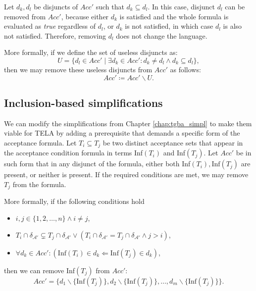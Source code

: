 \documentclass[
  digital, %
  twoside, %
  table,   %
  lof,     %
  lot,     %
]{fithesis3}
\begin{document}
Let $d_k, d_l$ be disjuncts of $Acc'$ such that $d_k \subseteq d_l$. In this case, disjunct $d_l$ can be removed from $Acc'$, because either $d_k$ is satisfied and the whole formula is evaluated as \emph{true} regardless of $d_l$, or $d_k$ is not satisfied, in which case $d_l$ is also not satisfied. Therefore, removing $d_l$ does not change the language.

More formally, if we define the set of useless disjuncts as:
\begin{equation*}
  U = \{d_l \in Acc' \mid \exists d_k \in Acc' \colon d_k \neq d_l \wedge d_k \subseteq d_l\},
\end{equation*}
then we may remove these useless disjuncts from $Acc'$ as follows:
\begin{equation*}
  Acc' \coloneqq Acc' \smallsetminus U.
\end{equation*}

\subsection{Inclusion-based simplifications}
We can modify the simplifications from Chapter \ref{chap:tgba_simpl} to make them viable for TELA by adding a prerequisite that demands a specific form of the acceptance formula. Let $T_i \subseteq T_j$ be two distinct acceptance sets that appear in the acceptance condition formula in terms Inf$(T_i)$ and Inf$(T_j)$. Let $Acc'$ be in such form that in any disjunct of the formula, either both Inf$(T_i), \text{Inf}(T_j)$ are present, or neither is present. If the required conditions are met, we may remove $T_j$ from the formula. 

More formally, if the following conditions hold
\begin{itemize}
  \item $i, j \in \{1, 2, \dots, n\} \wedge i \neq j$,
  \item $T_i \cap \delta_{\mathcal{A'}} \subsetneq T_j \cap \delta_{\mathcal{A'}} \vee (T_i \cap \delta_{\mathcal{A'}} = T_j \cap \delta_{\mathcal{A'}} \wedge j > i)$,
  \item $\forall d_k \in Acc' \colon (\text{Inf}(T_i) \in d_k \Leftarrow \text{Inf}(T_j) \in d_k)$,
\end{itemize}
then we can remove Inf$(T_j)$ from $Acc'$: 
\begin{equation*}
  Acc' = \{d_1 \smallsetminus \{\text{Inf}(T_j)\}, d_2 \smallsetminus \{\text{Inf}(T_j)\}, \dots, d_m \smallsetminus \{\text{Inf}(T_j)\}\}.
\end{equation*} 
\end{document}
